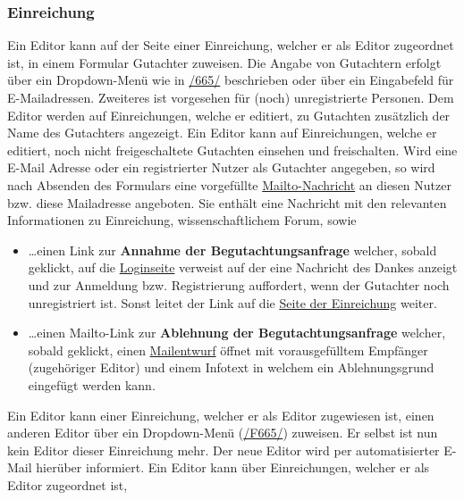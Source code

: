 \subsubsection{Einreichung} \label{ed:ein}
\begin{description}
     Ein Editor kann auf der Seite einer Einreichung, welcher er als Editor zugeordnet ist,
    in einem Formular Gutachter zuweisen. Die Angabe von Gutachtern erfolgt über ein Dropdown-Menü
    wie in \hyperref[funkt:665]{/665/} beschrieben oder über ein Eingabefeld für E-Mailadressen.
    Zweiteres ist vorgesehen für (noch) unregistrierte Personen.
     Dem Editor werden auf Einreichungen, welche er editiert,
    zu Gutachten zusätzlich der Name des Gutachters angezeigt.
     Ein Editor kann auf Einreichungen, welche er editiert, noch nicht freigeschaltete Gutachten einsehen und freischalten.
     Wird eine E-Mail Adresse oder ein registrierter Nutzer als Gutachter angegeben,
    so wird nach Absenden des Formulars eine vorgefüllte \hyperref[glo:mailto]{Mailto-Nachricht} an diesen Nutzer bzw. diese Mailadresse angeboten.
    Sie enthält eine Nachricht mit den relevanten Informationen zu Einreichung, wissenschaftlichem Forum, sowie
    \begin{itemize}
        \item \ldots einen Link zur \textbf{Annahme der Begutachtungsanfrage} welcher, sobald geklickt,
        auf die \hyperref[an:log]{Loginseite} verweist auf der eine Nachricht des Dankes anzeigt und zur Anmeldung bzw.
        Registrierung auffordert, wenn der Gutachter noch unregistriert ist. Sonst leitet der Link auf die
        \hyperref[nut:ein]{Seite der Einreichung} weiter.
        \item \ldots einen Mailto-Link zur \textbf{Ablehnung der Begutachtungsanfrage} welcher, sobald
        geklickt, einen \hyperref[glo:mailto]{Mailentwurf} öffnet mit vorausgefülltem Empfänger (zugehöriger Editor)
        und einem Infotext in welchem ein Ablehnungsgrund eingefügt werden kann.
    \end{itemize}
     Ein Editor kann einer Einreichung, welcher er als Editor zugewiesen ist, einen anderen Editor
    über ein Dropdown-Menü (\hyperref[funkt:665]{/F665/}) zuweisen. Er selbst ist nun kein Editor dieser Einreichung mehr.
    Der neue Editor wird per automatisierter E-Mail hierüber informiert.
     Ein Editor kann über Einreichungen, welcher er als Editor zugeordnet ist,

\end{description}
